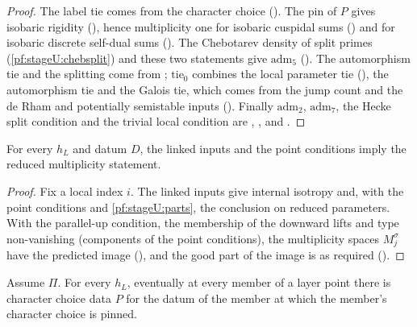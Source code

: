 \begin{proof}
The label tie comes from the character choice (). The pin of $P$ gives isobaric
rigidity (), hence multiplicity one for isobaric cuspidal sums
() and for isobaric discrete self-dual sums
(). The Chebotarev density of split primes
(\cref{pf:stageU:chebsplit}) and these two statements give $\mathrm{adm}_5$
(). The automorphism tie and the splitting come from
; $\mathrm{tie}_0$ combines the local parameter tie
(), the automorphism tie and the Galois tie, which comes from the jump count and the de Rham
and potentially semistable inputs (). Finally $\mathrm{adm}_2$,
$\mathrm{adm}_7$, the Hecke split condition and the trivial local condition are ,
,
 and .
\end{proof}

\begin{lemma}\label{pf:stageU:redmult}
For every $h_L$ and datum $D$, the linked inputs and the point conditions imply the reduced multiplicity statement.
\end{lemma}

\begin{proof}
Fix a local index $i$. The linked inputs give internal isotropy and, with the point conditions and \cref{pf:stageU:parts}, the
conclusion on reduced parameters. With the parallel-up condition, the membership of the downward lifts and type non-vanishing
(components of the point conditions), the multiplicity spaces $M_j^\sigma$ have the predicted image
(), and the good part of the image is as required
().
\end{proof}

\begin{lemma}\label{pf:stageU:pin}
Assume $\Pi$. For every $h_L$, eventually at every member of a layer point there is character choice data $P$ for the datum of the
member at which the member's character choice is pinned.
\end{lemma}

